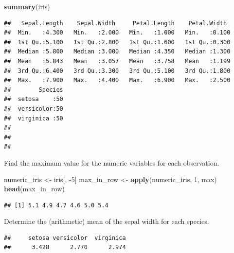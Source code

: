 \documentclass[
]{book}
\newenvironment{Shaded}{\begin{snugshade}}{\end{snugshade}}
\newcommand{\DataTypeTok}[1]{\textcolor[rgb]{0.13,0.29,0.53}{#1}}
\newcommand{\DecValTok}[1]{\textcolor[rgb]{0.00,0.00,0.81}{#1}}
\newcommand{\KeywordTok}[1]{\textcolor[rgb]{0.13,0.29,0.53}{\textbf{#1}}}
\newcommand{\NormalTok}[1]{#1}
\newcommand{\OperatorTok}[1]{\textcolor[rgb]{0.81,0.36,0.00}{\textbf{#1}}}
\newcommand{\StringTok}[1]{\textcolor[rgb]{0.31,0.60,0.02}{#1}}
\begin{document}
\begin{Shaded}
\begin{Highlighting}[]
\KeywordTok{summary}\NormalTok{(iris)}
\end{Highlighting}
\end{Shaded}

\begin{verbatim}
##   Sepal.Length    Sepal.Width     Petal.Length    Petal.Width   
##  Min.   :4.300   Min.   :2.000   Min.   :1.000   Min.   :0.100  
##  1st Qu.:5.100   1st Qu.:2.800   1st Qu.:1.600   1st Qu.:0.300  
##  Median :5.800   Median :3.000   Median :4.350   Median :1.300  
##  Mean   :5.843   Mean   :3.057   Mean   :3.758   Mean   :1.199  
##  3rd Qu.:6.400   3rd Qu.:3.300   3rd Qu.:5.100   3rd Qu.:1.800  
##  Max.   :7.900   Max.   :4.400   Max.   :6.900   Max.   :2.500  
##        Species  
##  setosa    :50  
##  versicolor:50  
##  virginica :50  
##                 
##                 
## 
\end{verbatim}

Find the maximum value for the numeric variables for each observation.

\begin{Shaded}
\begin{Highlighting}[]
\NormalTok{numeric_iris <-}\StringTok{ }\NormalTok{iris[, }\DecValTok{-5}\NormalTok{]}
\NormalTok{max_in_row <-}\StringTok{ }\KeywordTok{apply}\NormalTok{(numeric_iris, }\DecValTok{1}\NormalTok{, max)}
\KeywordTok{head}\NormalTok{(max_in_row)}
\end{Highlighting}
\end{Shaded}

\begin{verbatim}
## [1] 5.1 4.9 4.7 4.6 5.0 5.4
\end{verbatim}

Determine the (arithmetic) mean of the sepal width for each species.

\begin{Shaded}
\end{Shaded}

\begin{verbatim}
##     setosa versicolor  virginica 
##      3.428      2.770      2.974
\end{verbatim}
\end{document}
